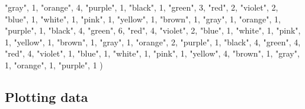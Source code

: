 \documentclass[
]{article}
\newenvironment{Shaded}{\begin{snugshade}}{\end{snugshade}}
\newcommand{\DecValTok}[1]{\textcolor[rgb]{0.00,0.00,0.81}{#1}}
\newcommand{\NormalTok}[1]{#1}
\newcommand{\StringTok}[1]{\textcolor[rgb]{0.31,0.60,0.02}{#1}}
\begin{document}
\begin{Shaded}
\begin{Highlighting}[]
  \StringTok{"gray"}\NormalTok{, }\DecValTok{1}\NormalTok{,}
  \StringTok{"orange"}\NormalTok{, }\DecValTok{4}\NormalTok{,}
  \StringTok{"purple"}\NormalTok{, }\DecValTok{1}\NormalTok{,}
    \StringTok{"black"}\NormalTok{, }\DecValTok{1}\NormalTok{,}
  \StringTok{"green"}\NormalTok{, }\DecValTok{3}\NormalTok{,}
  \StringTok{"red"}\NormalTok{, }\DecValTok{2}\NormalTok{,}
  \StringTok{"violet"}\NormalTok{, }\DecValTok{2}\NormalTok{,}
  \StringTok{"blue"}\NormalTok{, }\DecValTok{1}\NormalTok{,}
  \StringTok{"white"}\NormalTok{, }\DecValTok{1}\NormalTok{,}
  \StringTok{"pink"}\NormalTok{, }\DecValTok{1}\NormalTok{,}
  \StringTok{"yellow"}\NormalTok{, }\DecValTok{1}\NormalTok{,}
  \StringTok{"brown"}\NormalTok{, }\DecValTok{1}\NormalTok{, }
  \StringTok{"gray"}\NormalTok{, }\DecValTok{1}\NormalTok{,}
  \StringTok{"orange"}\NormalTok{, }\DecValTok{1}\NormalTok{,}
  \StringTok{"purple"}\NormalTok{, }\DecValTok{1}\NormalTok{,}
    \StringTok{"black"}\NormalTok{, }\DecValTok{4}\NormalTok{,}
  \StringTok{"green"}\NormalTok{, }\DecValTok{6}\NormalTok{,}
  \StringTok{"red"}\NormalTok{, }\DecValTok{4}\NormalTok{,}
  \StringTok{"violet"}\NormalTok{, }\DecValTok{2}\NormalTok{,}
  \StringTok{"blue"}\NormalTok{, }\DecValTok{1}\NormalTok{,}
  \StringTok{"white"}\NormalTok{, }\DecValTok{1}\NormalTok{,}
  \StringTok{"pink"}\NormalTok{, }\DecValTok{1}\NormalTok{,}
  \StringTok{"yellow"}\NormalTok{, }\DecValTok{1}\NormalTok{,}
  \StringTok{"brown"}\NormalTok{, }\DecValTok{1}\NormalTok{,}
  \StringTok{"gray"}\NormalTok{, }\DecValTok{1}\NormalTok{,}
  \StringTok{"orange"}\NormalTok{, }\DecValTok{2}\NormalTok{,}
  \StringTok{"purple"}\NormalTok{, }\DecValTok{1}\NormalTok{,}
    \StringTok{"black"}\NormalTok{, }\DecValTok{4}\NormalTok{,}
  \StringTok{"green"}\NormalTok{, }\DecValTok{4}\NormalTok{,}
  \StringTok{"red"}\NormalTok{, }\DecValTok{4}\NormalTok{,}
  \StringTok{"violet"}\NormalTok{, }\DecValTok{1}\NormalTok{,}
  \StringTok{"blue"}\NormalTok{, }\DecValTok{1}\NormalTok{,}
  \StringTok{"white"}\NormalTok{, }\DecValTok{1}\NormalTok{,}
  \StringTok{"pink"}\NormalTok{, }\DecValTok{1}\NormalTok{,}
  \StringTok{"yellow"}\NormalTok{, }\DecValTok{4}\NormalTok{,}
  \StringTok{"brown"}\NormalTok{, }\DecValTok{1}\NormalTok{,}
  \StringTok{"gray"}\NormalTok{, }\DecValTok{1}\NormalTok{,}
  \StringTok{"orange"}\NormalTok{, }\DecValTok{1}\NormalTok{,}
  \StringTok{"purple"}\NormalTok{, }\DecValTok{1}
\NormalTok{)}
\end{Highlighting}
\end{Shaded}

\hypertarget{plotting-data}{%
\subsection{Plotting data}\label{plotting-data}}
\end{document}
